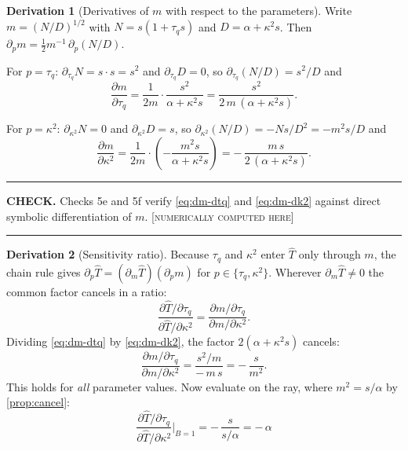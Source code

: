 \documentclass[11pt,a4paper]{article}
\theoremstyle{definition}
\newtheorem{derivationx}{Derivation}[section]
\newenvironment{checkbox}%
  {\par\medskip\noindent\begin{minipage}{\linewidth}%
   \rule{\linewidth}{0.4pt}\par\noindent\textbf{CHECK.}\enspace}%
  {\par\rule{\linewidth}{0.4pt}\end{minipage}\par\medskip}
\newcommand{\NUM}{\textcolor{red!55!black}{\footnotesize[\textsc{numerically computed here}]}}
\newcommand{\tq}{\tau_{q}}
\newcommand{\kk}{\kappa^{2}}
\newcommand{\Bnum}{B}
\newcommand{\Lap}[1]{\hat{#1}}
\begin{document}
\begin{derivationx}[Derivatives of $m$ with respect to the parameters]
\label{der:dm}
Write $m=(N/D)^{1/2}$ with $N=s(1+\tq s)$ and $D=\alpha+\kk s$. Then
$\partial_{p}m = \tfrac{1}{2}m^{-1}\,\partial_{p}(N/D)$.

For $p=\tq$: $\partial_{\tq}N = s\cdot s = s^{2}$ and $\partial_{\tq}D=0$, so
$\partial_{\tq}(N/D)=s^{2}/D$ and
\begin{equation}
  \frac{\partial m}{\partial \tq}
   = \frac{1}{2m}\cdot\frac{s^{2}}{\alpha+\kk s}
   = \frac{s^{2}}{2\,m\,(\alpha+\kk s)} .
  \label{eq:dm-dtq}
\end{equation}

For $p=\kk$: $\partial_{\kk}N=0$ and $\partial_{\kk}D=s$, so
$\partial_{\kk}(N/D) = -N s/D^{2} = -m^{2}s/D$ and
\begin{equation}
  \frac{\partial m}{\partial \kk}
   = \frac{1}{2m}\cdot\left(-\frac{m^{2}s}{\alpha+\kk s}\right)
   = -\,\frac{m\,s}{2\,(\alpha+\kk s)} .
  \label{eq:dm-dk2}
\end{equation}
\end{derivationx}

\begin{checkbox}
Checks 5e and 5f verify \eqref{eq:dm-dtq} and \eqref{eq:dm-dk2} against direct
symbolic differentiation of $m$. \NUM
\end{checkbox}

\begin{derivationx}[Sensitivity ratio]
\label{der:ratio}
Because $\tq$ and $\kk$ enter $\Lap T$ only through $m$, the chain rule gives
$\partial_{p}\Lap T = (\partial_{m}\Lap T)(\partial_{p}m)$ for
$p\in\{\tq,\kk\}$. Wherever $\partial_{m}\Lap T\neq0$ the common factor cancels
in a ratio:
\begin{equation}
  \frac{\partial \Lap T/\partial \tq}
       {\partial \Lap T/\partial \kk}
  = \frac{\partial m/\partial \tq}{\partial m/\partial \kk} .
  \label{eq:ratio-chain}
\end{equation}
Dividing \eqref{eq:dm-dtq} by \eqref{eq:dm-dk2}, the factor
$2(\alpha+\kk s)$ cancels:
\begin{equation}
  \frac{\partial m/\partial \tq}{\partial m/\partial \kk}
   = \frac{s^{2}/m}{-\,m\,s}
   = -\,\frac{s}{m^{2}} .
  \label{eq:ratio-general}
\end{equation}
This holds for \emph{all} parameter values. Now evaluate on the ray, where
$m^{2}=s/\alpha$ by \cref{prop:cancel}:
\begin{equation}
  \boxed{\ \frac{\partial \Lap T/\partial \tq}
       {\partial \Lap T/\partial \kk}\Bigg|_{\Bnum=1}
   = -\,\frac{s}{s/\alpha}
   = -\,\alpha\ }
  \label{eq:ratio-resonance}
\end{equation}
\end{derivationx}
\end{document}
